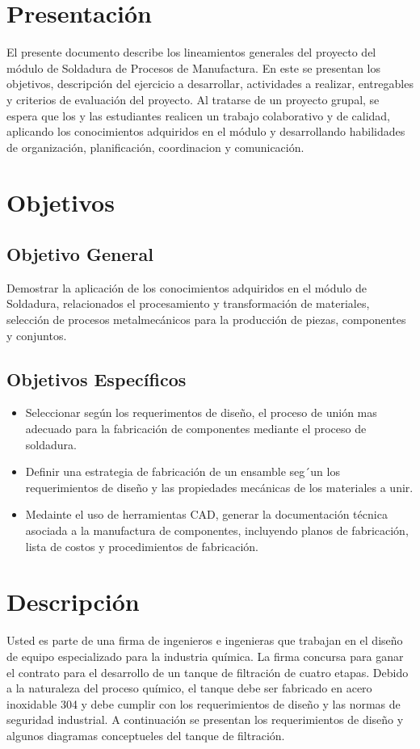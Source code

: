 \documentclass[10pt]{article}
\begin{document}
\section{Presentación}
El presente documento describe los lineamientos generales del proyecto del módulo de Soldadura de Procesos de Manufactura. En este se presentan los objetivos, 
descripción del ejercicio a desarrollar, actividades a realizar, entregables y criterios de evaluación del proyecto. Al tratarse de un proyecto grupal, se espera que los y las estudiantes
realicen un trabajo colaborativo y de calidad, aplicando los conocimientos adquiridos en el módulo y desarrollando habilidades de organización, planificación, coordinacion y comunicación.

\section{Objetivos}

\subsection{Objetivo General}
Demostrar la aplicación de los conocimientos adquiridos en el módulo de Soldadura, relacionados el procesamiento y transformación de materiales, selección de procesos metalmecánicos para la producción de piezas, 
componentes y conjuntos.
\subsection{Objetivos Específicos}
\begin{itemize}
    \item Seleccionar según los requerimentos de diseño, el proceso de unión mas adecuado para la fabricación de componentes mediante el proceso de soldadura.
    \item Definir una estrategia de fabricación de un ensamble seg´un los requerimientos de diseño y las propiedades mecánicas de los materiales a unir. 
    \item Medainte el uso de herramientas CAD, generar la documentación técnica asociada a la manufactura de componentes, incluyendo planos de fabricación, 
    lista de costos y procedimientos de fabricación. 
\end{itemize}

\section{Descripción}
Usted es parte de una firma de ingenieros e ingenieras que trabajan en el diseño de equipo especializado para la industria química. La firma concursa para ganar el contrato para el desarrollo de un tanque de 
filtración de cuatro etapas. Debido a la naturaleza del proceso químico, el tanque debe ser fabricado en acero inoxidable 304 y debe cumplir con los requerimientos de diseño y las normas de seguridad 
industrial. A continuación se presentan los requerimientos de diseño y algunos diagramas conceptueles del tanque de filtración.
\end{document}
